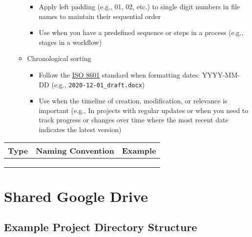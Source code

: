 \documentclass[
  letterpaper,
  DIV=11,
  numbers=noendperiod]{scrreprt}
\providecommand{\tightlist}{%
  \setlength{\itemsep}{0pt}\setlength{\parskip}{0pt}}\usepackage{longtable,booktabs,array}
\begin{document}
\begin{enumerate}
\begin{itemize}
    \begin{itemize}
    \tightlist
    \item
      Apply left padding (e.g., 01, 02, etc.) to single digit numbers in
      file names to maintain their sequential order
    \item
      Use when you have a predefined sequence or steps in a process
      (e.g., stages in a workflow)
    \end{itemize}
  \item
    Chronological sorting

    \begin{itemize}
    \tightlist
    \item
      Follow the
      \href{https://www.iso.org/iso-8601-date-and-time-format.html}{ISO
      8601} standard when formatting dates: YYYY-MM-DD (e.g.,
      \texttt{2020-12-01\_draft.docx})
    \item
      Use when the timeline of creation, modification, or relevance is
      important (e.g., In projects with regular updates or when you need
      to track progress or changes over time where the most recent date
      indicates the latest version)
    \end{itemize}
  \end{itemize}
\end{enumerate}

\begin{longtable}[]{@{}lll@{}}
\toprule\noalign{}
Type & Naming Convention & Example \\
\midrule\noalign{}
\endhead
\bottomrule\noalign{}
\endlastfoot
& & \\
& & \\
& & \\
\end{longtable}

\section*{Shared Google Drive}\label{shared-google-drive}


\subsection*{Example Project Directory
Structure}\label{example-project-directory-structure}
\end{document}
